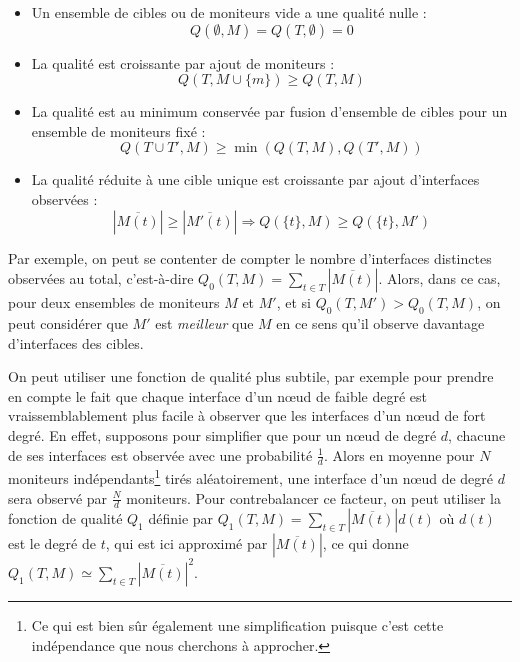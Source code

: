 \begin{itemize}
  \item Un ensemble de cibles ou de moniteurs vide a une qualité nulle :
  \begin{equation}
  Q(\emptyset, M) = Q(T, \emptyset) = 0
  \end{equation}
  \item La qualité est croissante par ajout de moniteurs :
  \begin{equation}
  \label{eq:udpping-monitors-diversity-add-monitors}   
  Q(T, M \cup \{ m \}) \geq Q(T, M)
  \end{equation}
  \item La qualité est au minimum conservée par fusion d'ensemble de cibles pour
  un ensemble de moniteurs fixé :
  \begin{equation}
  \label{eq:udpping-monitors-diversity-merge-targets}
  Q(T \cup T', M) \geq {\min}(Q(T, M), Q(T', M))
  \end{equation}
  \item La qualité réduite à une cible unique est croissante par ajout
  d'interfaces observées :
  \begin{equation}
  |\overline{M(t)}| \geq |\overline{M'(t)}| \Rightarrow Q(\{ t \}, M) \geq
  Q(\{ t \}, M')
  \end{equation}
\end{itemize}

Par exemple, on peut se contenter de compter le nombre
d'interfaces distinctes observées au total, c'est-à-dire $Q_0(T, M) = \sum_{t
\in T} | \overline{M(t)} |$. Alors, dans ce cas, pour deux ensembles de moniteurs
$M$ et $M'$, et si $Q_0(T, M') > Q_0(T, M)$, on peut considérer que $M'$
est \emph{meilleur} que $M$ en ce sens qu'il observe davantage d'interfaces
des cibles.

On peut utiliser une fonction de qualité plus subtile, par exemple pour prendre
en compte le fait que chaque interface d'un n\oe{}ud de faible degré est
vraissemblablement plus facile à observer que les interfaces d'un n\oe{}ud de fort
degré. En effet, supposons pour simplifier que pour un n\oe{}ud de degré $d$,
chacune de ses interfaces est observée avec une probabilité $\frac{1}{d}$. Alors
en moyenne pour $N$ moniteurs indépendants\footnote{Ce qui est bien sûr
également une simplification puisque c'est cette indépendance que nous
cherchons à approcher.} tirés aléatoirement, une interface d'un n\oe{}ud de
degré $d$ sera observé par $\frac{N}{d}$ moniteurs. Pour contrebalancer ce facteur, on
peut utiliser la fonction de qualité $Q_1$ définie par $Q_1(T, M) = \sum_{t \in
T} |\overline{M(t)}|d(t)$ où $d(t)$ est le degré de $t$, qui est ici approximé par
$|\overline{M(t)}|$, ce qui donne $Q_1(T, M) \simeq \sum_{t \in T}
|\overline{M(t)}|^2$.


